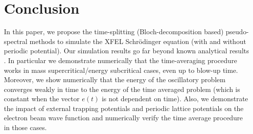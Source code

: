 \documentclass[10pt, leqno]{amsart}
\begin{document}
\section{Conclusion}
In this paper, we propose the time-splitting (Bloch-decomposition based) pseudo-spectral
methods to simulate the XFEL Schr\"odinger equation (with and without periodic potential). Our simulation results go far beyond known analytical results \cite{xfel1}. In particular we demonstrate numerically that the time-averaging procedure works in mass supercritical/energy subcritical cases, even up to blow-up time. Moreover, we show numerically that the energy of the oscillatory problem converges weakly in time to the energy of the time averaged problem (which is constant when the vector $e(t)$ is not dependent on time). Also, we demonstrate the impact of external trapping potentials and periodic lattice potentials on the electron beam wave function and numerically verify the time average procedure in those cases.
\end{document}
